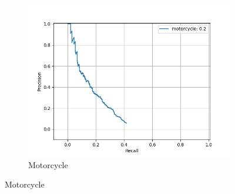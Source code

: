 \begin{figure}[H]
\begin{subfigure}[t]{0.325\textwidth}
    		\includegraphics[width=\textwidth]{images/bnn_pr/class_motorcycle_pr.jpg}
    		\caption{Motorcycle}
    	\end{subfigure}
    

\end{figure}
